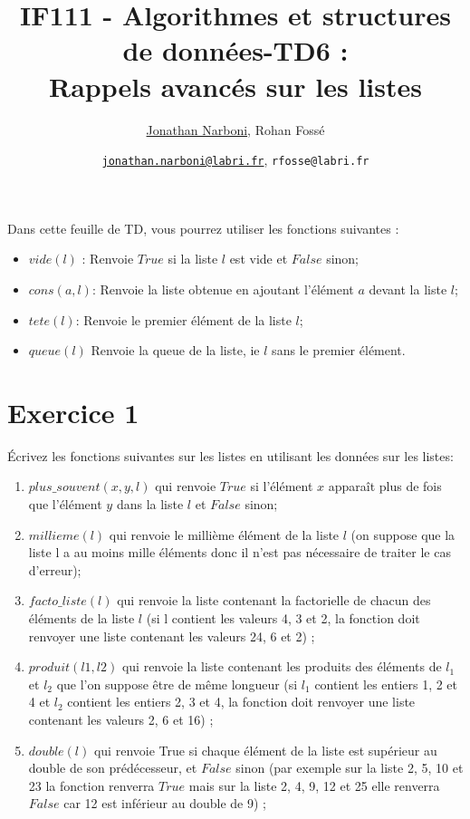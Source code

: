 \documentclass[10pt,a4paper]{article}
\title{IF111 - Algorithmes et structures de données-TD6 :\\ Rappels avancés sur les listes}
\date{}
\author{\underline{Jonathan Narboni}, Rohan Fossé}
\date{\underline{\texttt{jonathan.narboni@labri.fr}}, \texttt{rfosse@labri.fr}}
\begin{document}
\maketitle

Dans cette feuille de TD, vous pourrez utiliser les fonctions suivantes : 
\begin{itemize}
    \item $vide(l)$ : Renvoie $True$ si la liste $l$ est vide et $False$ sinon;
    \item $cons(a,l)$: Renvoie la liste obtenue en ajoutant l'élément $a$ devant la liste $l$;
    \item $tete(l)$: Renvoie le premier élément de la liste $l$;
    \item $queue(l)$ Renvoie la queue de la liste, ie $l$ sans le premier élément.
\end{itemize}


\section*{Exercice 1}
Écrivez les fonctions suivantes sur les listes en utilisant les données sur les listes:

\begin{enumerate}
    \item $plus\_souvent(x,y,l)$ qui renvoie $True$ si l’élément $x$ apparaît plus de fois que l’élément $y$ dans la liste $l$ et $False$ sinon;
    \item $millieme(l)$ qui renvoie le millième élément de la liste $l$ (on suppose que la liste l a au moins
mille éléments donc il n’est pas nécessaire de traiter le cas d’erreur);
    \item $facto\_liste(l)$ qui renvoie la liste contenant la factorielle de chacun des éléments de la liste $l$
(si l contient les valeurs 4, 3 et 2, la fonction doit renvoyer une liste contenant les valeurs 24, 6 et
2) ;
    \item $produit(l1,l2)$ qui renvoie la liste contenant les produits des éléments de $l_1$ et $l_2$ que l’on
suppose être de même longueur (si $l_1$ contient les entiers 1, 2 et 4 et $l_2$ contient les entiers 2, 3 et
4, la fonction doit renvoyer une liste contenant les valeurs 2, 6 et 16) ;
    \item $double(l)$ qui renvoie True si chaque élément de la liste est supérieur au double de son prédécesseur, et $False$ sinon (par exemple sur la liste 2, 5, 10 et 23 la fonction renverra $True$ mais sur la liste 2, 4, 9, 12 et 25 elle renverra $False$ car 12 est inférieur au double de 9) ;
\end{enumerate}
\end{document}
